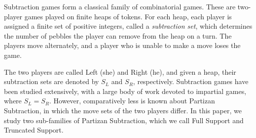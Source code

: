 \documentclass[oneside,reqno]{amsart}
\begin{document}
Subtraction games form a classical family of combinatorial games. 
These are two-player games played on finite heaps of tokens. For each heap, each player is assigned a finite set of positive integers, called a {\em subtraction set}, which determines the number of pebbles the player can remove from the heap on a turn. The players move alternately, and a player who is unable to make a move loses the game. 

The two players are called Left (she) and Right (he), and given a heap, their subtraction sets are denoted by $S_L$ and $S_R$, respectively. Subtraction games have been studied extensively, with a large body of work devoted to impartial games, where $S_L=S_R$. However, comparatively less is known about {\sc Partizan Subtraction}, in which the move sets of the two players differ. In this paper, we study two sub-families of {\sc Partizan Subtraction}, which we call {\sc Full Support} and {\sc Truncated Support}. %
\end{document}
